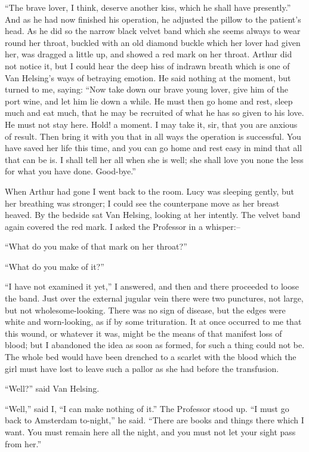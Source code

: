 \documentclass[12pt,openright]{book}
\begin{document}
“The brave lover, I think, deserve another kiss, which he shall have presently.” And as he had now finished his operation, he adjusted the pillow to the patient’s head. As he did so the narrow black velvet band which she seems always to wear round her throat, buckled with an old diamond buckle which her lover had given her, was dragged a little up, and showed a red mark on her throat. Arthur did not notice it, but I could hear the deep hiss of indrawn breath which is one of Van Helsing’s ways of betraying emotion. He said nothing at the moment, but turned to me, saying: “Now take down our brave young lover, give him of the port wine, and let him lie down a while. He must then go home and rest, sleep much and eat much, that he may be recruited of what he has so given to his love. He must not stay here. Hold! a moment. I may take it, sir, that you are anxious of result. Then bring it with you that in all ways the operation is successful. You have saved her life this time, and you can go home and rest easy in mind that all that can be is. I shall tell her all when she is well; she shall love you none the less for what you have done. Good-bye.”

When Arthur had gone I went back to the room. Lucy was sleeping gently, but her breathing was stronger; I could see the counterpane move as her breast heaved. By the bedside sat Van Helsing, looking at her intently. The velvet band again covered the red mark. I asked the Professor in a whisper:–

“What do you make of that mark on her throat?”

“What do you make of it?”

“I have not examined it yet,” I answered, and then and there proceeded to loose the band. Just over the external jugular vein there were two punctures, not large, but not wholesome-looking. There was no sign of disease, but the edges were white and worn-looking, as if by some trituration. It at once occurred to me that this wound, or whatever it was, might be the means of that manifest loss of blood; but I abandoned the idea as soon as formed, for such a thing could not be. The whole bed would have been drenched to a scarlet with the blood which the girl must have lost to leave such a pallor as she had before the transfusion.

“Well?” said Van Helsing.

“Well,” said I, “I can make nothing of it.” The Professor stood up. “I must go back to Amsterdam to-night,” he said. “There are books and things there which I want. You must remain here all the night, and you must not let your sight pass from her.”
\end{document}
